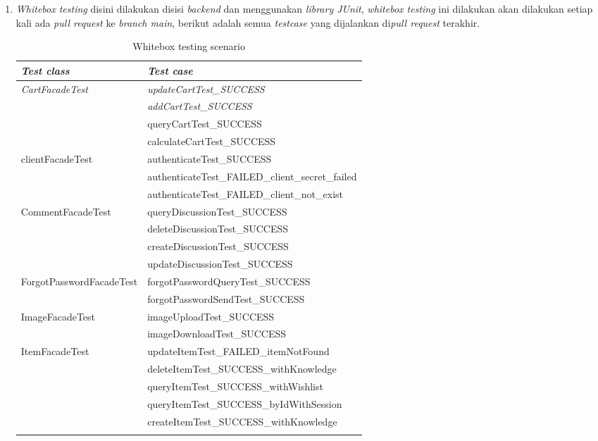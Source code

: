 \documentclass[a4paper]{article}
\begin{document}
\begin{enumerate}
    \item \textit{Whitebox testing} disini dilakukan disisi \textit{backend} dan menggunakan \textit{library JUnit}, \textit{whitebox testing} ini dilakukan akan dilakukan setiap kali ada \textit{pull request} ke \textit{branch main}, berikut adalah semua \textit{testcase} yang dijalankan di\textit{pull request} terakhir.
\begin{longtable}[c]{|l|l|}
\caption{Whitebox testing scenario}
\label{tab:whiteboxTestingScenario}\\
\hline
\textit{Test class} & \textit{Test case} \\ \hline
\endfirsthead
\endhead
\multirow{4}{*}{\textit{CartFacadeTest}} & \textit{updateCartTest\_SUCCESS} \\ \cline{2-2} 
 & \textit{addCartTest\_SUCCESS} \\ \cline{2-2} 
 & queryCartTest\_SUCCESS \\ \cline{2-2} 
 & calculateCartTest\_SUCCESS \\ \hline
\multirow{3}{*}{clientFacadeTest} & authenticateTest\_SUCCESS \\ \cline{2-2} 
 & authenticateTest\_FAILED\_client\_secret\_failed \\ \cline{2-2} 
 & authenticateTest\_FAILED\_client\_not\_exist \\ \hline
\multirow{4}{*}{CommentFacadeTest} & queryDiscussionTest\_SUCCESS \\ \cline{2-2} 
 & deleteDiscussionTest\_SUCCESS \\ \cline{2-2} 
 & createDiscussionTest\_SUCCESS \\ \cline{2-2} 
 & updateDiscussionTest\_SUCCESS \\ \hline
\multirow{2}{*}{ForgotPasswordFacadeTest} & forgotPasswordQueryTest\_SUCCESS \\ \cline{2-2} 
 & forgotPasswordSendTest\_SUCCESS \\ \hline
\multirow{2}{*}{ImageFacadeTest} & imageUploadTest\_SUCCESS \\ \cline{2-2} 
 & imageDownloadTest\_SUCCESS \\ \hline
\multirow{15}{*}{ItemFacadeTest} & updateItemTest\_FAILED\_itemNotFound \\ \cline{2-2} 
 & deleteItemTest\_SUCCESS\_withKnowledge \\ \cline{2-2} 
 & queryItemTest\_SUCCESS\_withWishlist \\ \cline{2-2} 
 & queryItemTest\_SUCCESS\_byIdWithSession \\ \cline{2-2} 
 & createItemTest\_SUCCESS\_withKnowledge \\ \cline{2-2} 

\end{longtable}
\end{enumerate}
\end{document}
